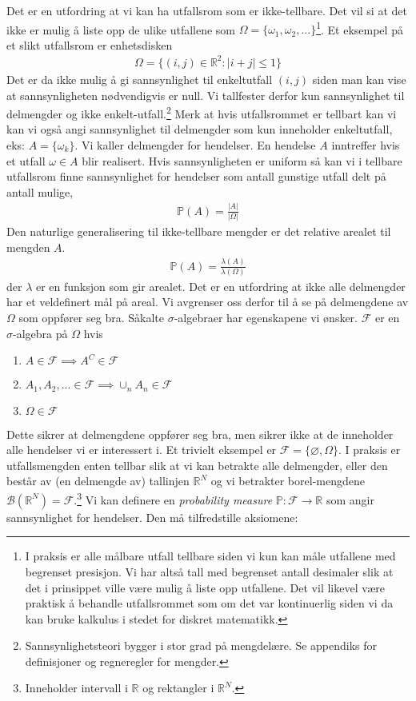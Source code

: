 Det er en utfordring at vi kan ha utfallsrom som er ikke-tellbare. Det vil si at det ikke er mulig å liste opp de ulike utfallene som $\Omega = \{\omega_1,\omega_2,... \}$\footnote{I praksis er alle målbare utfall tellbare siden vi kun kan måle utfallene med begrenset presisjon. Vi har altså tall med begrenset antall desimaler slik at det i prinsippet ville være mulig å liste opp utfallene. Det vil likevel være praktisk å behandle utfallsrommet som om det var kontinuerlig siden vi da kan bruke kalkulus i stedet for diskret matematikk.}. Et eksempel på et slikt utfallsrom er enhetsdisken
\begin{align}
\Omega = \{(i,j) \in \mathbb{R}^2:|i+j|\leq1\}
\end{align}
Det er da ikke mulig å gi sannsynlighet til enkeltutfall $(i,j)$ siden man kan vise at sannsynligheten nødvendigvis er null. Vi tallfester derfor kun sannsynlighet til delmengder og ikke enkelt-utfall.\footnote{Sannsynlighetsteori bygger i stor grad på mengdelære. Se appendiks for definisjoner og regneregler for mengder.} Merk at hvis utfallsrommet er tellbart kan vi kan vi også angi sannsynlighet til delmengder som kun inneholder enkeltutfall, eks: $A = \{\omega_k\}$. Vi kaller delmengder for hendelser. En hendelse $A$ inntreffer hvis et utfall $\omega \in A$ blir realisert. Hvis sannsynligheten er uniform så kan vi i tellbare utfallsrom finne sannsynlighet for hendelser som antall gunstige utfall delt på antall mulige,
\begin{align}
\mathbb{P}(A) = \frac{|A|}{|\Omega|}
\end{align}
Den naturlige generalisering til ikke-tellbare mengder er det relative arealet til mengden $A$.
\begin{align}
\mathbb{P}(A) = \frac{\lambda(A)}{\lambda(\Omega)}
\end{align}
der $\lambda$ er en funksjon som gir arealet. Det er en utfordring at ikke alle delmengder har et veldefinert mål på areal. Vi avgrenser oss derfor til å se på delmengdene av $\Omega$ som oppfører seg bra. Såkalte $\sigma$-algebraer har egenskapene vi ønsker. $\mathscr{F}$ er en $\sigma$-algebra på $\Omega$ hvis
\begin{enumerate}
\item $A \in \mathscr{F} \implies A^C \in \mathscr{F}$	
\item $A_1,A_2,... \in \mathscr{F} \implies \cup_n A_n \in \mathscr{F}$
\item $\Omega \in \mathscr{F}$
\end{enumerate}
Dette sikrer at delmengdene oppfører seg bra, men sikrer ikke at de inneholder alle hendelser vi er interessert i. Et trivielt eksempel er $\mathscr{F} = \{\varnothing,\Omega\}$. I praksis er utfallsmengden enten tellbar slik at vi kan betrakte alle delmengder, eller den består av (en delmengde av) tallinjen $\mathbb{R}^N$ og vi betrakter borel-mengdene $\mathscr{B}(\mathbb{R}^N) = \mathscr{F}$.\footnote{Inneholder intervall i $\mathbb{R}$ og rektangler i $\mathbb{R}^N$.} Vi kan definere en \textit{probability measure} $\mathbb{P}:\mathscr{F}\rightarrow \mathbb{R}$ som angir sannsynlighet for hendelser. Den må tilfredstille aksiomene:
